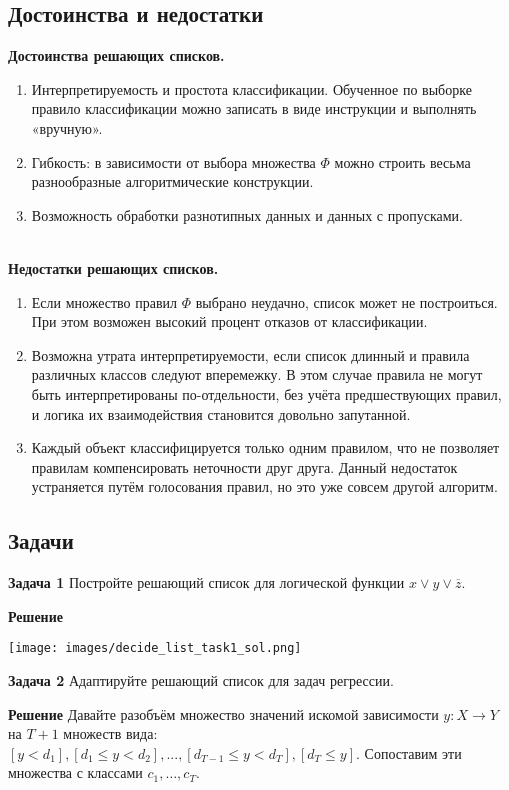 \subsection{Достоинства и недостатки}

\textbf{Достоинства решающих списков.}
\begin{enumerate}
    \item Интерпретируемость и простота классификации. Обученное по выборке правило классификации можно записать в виде инструкции и выполнять «вручную».
    \item Гибкость: в зависимости от выбора множества $\Phi$ можно строить весьма разнообразные алгоритмические конструкции.
    \item Возможность обработки разнотипных данных и данных с пропусками.
\end{enumerate}
\\
\textbf{Недостатки решающих списков.}
\begin{enumerate}
    \item Если множество правил $\Phi$ выбрано неудачно, список может не построиться. При этом возможен высокий процент отказов от классификации.
    \item Возможна утрата интерпретируемости, если список длинный и правила различных классов следуют вперемежку. В этом случае правила не могут быть
    интерпретированы по-отдельности, без учёта предшествующих правил, и логика их взаимодействия становится довольно запутанной.
    \item Каждый объект классифицируется только одним правилом, что не позволяет
    правилам компенсировать неточности друг друга. Данный недостаток устраняется путём голосования правил, но это уже совсем другой алгоритм.
\end{enumerate}

\subsection{Задачи}

\textbf{Задача 1}
Постройте решающий список для логической функции $x \vee y \vee \overline{z}.$

\textbf{Решение}

\texttt{[image: images/decide\_list\_task1\_sol.png]}

\textbf{Задача 2}
Адаптируйте решающий список для задач регрессии.

\textbf{Решение}
Давайте разобъём множество значений искомой зависимости $y: X \rightarrow{} Y$ на $T + 1$ множеств вида:
$[y < d_1], [d_1 \leq y < d_2], ..., [d_{T-1} \leq y < d_T], [d_T \leq y].$ 
Сопоставим эти множества с классами $c_1, \dots, c_T$.

